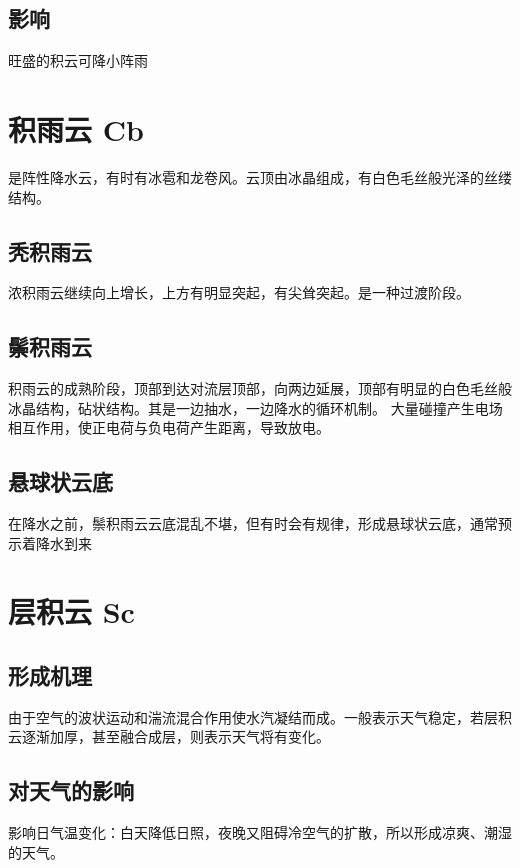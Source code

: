 \documentclass[UTF8,11pt]{ctexbook}
\begin{document}
\subsection{影响}

旺盛的积云可降小阵雨

\section{积雨云 Cb}

是阵性降水云，有时有冰雹和龙卷风。云顶由冰晶组成，有白色毛丝般光泽的丝缕结构。

\subsection{秃积雨云}

浓积雨云继续向上增长，上方有明显突起，有尖耸突起。是一种过渡阶段。

\subsection{鬃积雨云}

积雨云的成熟阶段，顶部到达对流层顶部，向两边延展，顶部有明显的白色毛丝般冰晶结构，砧状结构。其是一边抽水，一边降水的循环机制。 大量碰撞产生电场相互作用，使正电荷与负电荷产生距离，导致放电。	

\subsection{悬球状云底}

在降水之前，鬃积雨云云底混乱不堪，但有时会有规律，形成悬球状云底，通常预示着降水到来


\section{层积云 Sc}

\subsection{形成机理}

由于空气的波状运动和湍流混合作用使水汽凝结而成。一般表示天气稳定，若层积云逐渐加厚，甚至融合成层，则表示天气将有变化。

\subsection{对天气的影响}

影响日气温变化：白天降低日照，夜晚又阻碍冷空气的扩散，所以形成凉爽、潮湿的天气。
\end{document}
